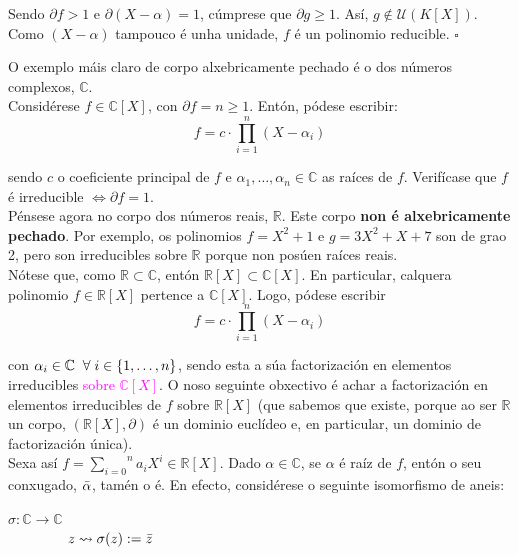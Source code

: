 \documentclass[twoside]{report}
\newcommand{\magen}[1]{\textcolor{magenta}{#1}}
\theoremstyle{mystyle}
\begin{document}
\noindent Sendo $\partial f > 1$ e $\partial (X - \alpha) = 1$, cúmprese que $\partial g \geq 1$. Así, $g \notin \mathcal{U}(K[X])$. Como $(X-\alpha)$ tampouco é unha unidade, $f$ é un polinomio reducible. $\square$\\

\pagebreak

\noindent O exemplo máis claro de corpo alxebricamente pechado é o dos números complexos, $\mathbb{C}$. \\

\noindent Considérese $f \in \mathbb{C}[X]$, con $\partial f = n \geq 1$. Entón, pódese escribir:
$$f = c \cdot \overset{n}{\underset{i = 1}{\prod}}(X - \alpha_{i})$$

\noindent sendo $c$ o coeficiente principal de $f$ e $\alpha_{1}, \ldots, \alpha_{n} \in \mathbb{C}$ as raíces de $f$. Verifícase que $f$ é irreducible $\Longleftrightarrow \partial f = 1$.\\

\noindent Pénsese agora no corpo dos números reais, $\mathbb{R}$. Este corpo \textbf{non é alxebricamente pechado}. Por exemplo, os polinomios $f = X^{2} + 1$ e $g = 3X^{2} + X + 7$ son de grao 2, pero son irreducibles sobre $\mathbb{R}$ porque non posúen raíces reais.\\

\noindent Nótese que, como $\mathbb{R} \subset \mathbb{C}$, entón $\mathbb{R}[X] \subset \mathbb{C}[X]$. En particular, calquera polinomio $f \in \mathbb{R}[X]$ pertence a $\mathbb{C}[X]$. Logo, pódese escribir 
$$f = c \cdot \overset{n}{\underset{i = 1}{\prod}}(X - \alpha_{i})$$

\noindent con $\alpha_{i} \in \mathbb{C} \hspace{2mm} \forall \hspace{1mm} i \in \{1, \ldots, n\}$, sendo esta a súa factorización en elementos irreducibles \magen{sobre $\mathbb{C}[X]$}. O noso seguinte obxectivo é achar a factorización en elementos irreducibles de $f$ sobre $\mathbb{R}[X]$ (que sabemos que existe, porque ao ser $\mathbb{R}$ un corpo, $(\mathbb{R}[X], \partial)$ é un dominio euclídeo e, en particular, un dominio de factorización única).\\ 

\noindent Sexa así $f = \overset{n}{\underset{i = 0}{\sum}}a_{i}X^{i} \in \mathbb{R}[X]$. Dado $\alpha \in \mathbb{C}$, se $\alpha$ é raíz de $f$, entón o seu conxugado, $\Bar{\alpha}$, tamén o é. En efecto, considérese o seguinte isomorfismo de aneis:
\begin{center}
    $\sigma: \mathbb{C} \longrightarrow \mathbb{C}$\\
    $\hspace{15mm} z \leadsto \sigma(z) := \Bar{z}$
\end{center}
\end{document}
